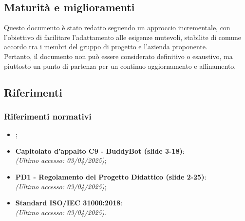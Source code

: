 \subsection{Maturità e miglioramenti}
Questo documento è stato redatto seguendo un approccio incrementale, 
con l'obiettivo di facilitare l'adattamento alle esigenze mutevoli, stabilite 
di comune accordo tra i membri del gruppo di progetto e l'azienda proponente.\\
Pertanto, il documento non può essere considerato definitivo o esaustivo, ma 
piuttosto un punto di partenza per un continuo aggiornamento e affinamento.

\subsection{Riferimenti}
\label{sec:riferimenti}

\subsubsection{Riferimenti normativi}
\begin{itemize}
    \item {}; \\
    \item \textbf{Capitolato d'appalto C9 - BuddyBot (slide 3-18)}: \\
    \emph{(Ultimo accesso: 03/04/2025)};\\
    \item \textbf{PD1 - Regolamento del Progetto Didattico (slide 2-25)}:\\
    \emph{(Ultimo accesso: 03/04/2025)};\\
    \item \textbf{Standard ISO/IEC 31000:2018}: \\
    \emph{(Ultimo accesso: 03/04/2025)}.\\
\end{itemize}

